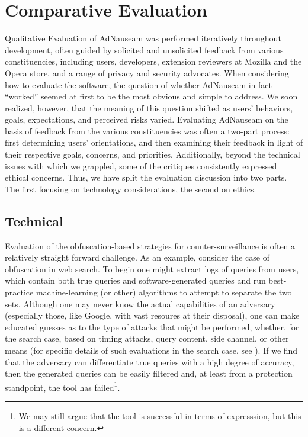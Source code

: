 \documentclass[conference]{IEEEtran}
\begin{document}
\section{Comparative Evaluation}

Qualitative Evaluation of AdNauseam was performed iteratively throughout development, often guided by solicited and unsolicited feedback from various constituencies, including users, developers, extension reviewers at Mozilla and the Opera store, and a range of privacy and security advocates. When considering how to evaluate the software, the question of whether AdNauseam in fact “worked” seemed at first to be the most obvious and simple to address. We soon realized, however, that the meaning of this question shifted as users' behaviors, goals, expectations, and perceived risks varied. Evaluating AdNauseam on the basis of feedback from the various constituencies was often a two-part process: first determining users' orientations, and then examining their feedback in light of their respective goals, concerns, and priorities. Additionally, beyond the technical issues with which we grappled, some of the critiques consistently expressed ethical concerns. Thus, we have split the evaluation discussion into two parts. The first focusing on technology considerations, the second on ethics.

\subsection{Technical}

Evaluation of the obfuscation-based strategies for counter-surveillance is often a relatively straight forward challenge. As an example, consider the case of obfuscation in web search. To begin one might extract logs of queries from users, which contain both true queries and software-generated queries and run best-practice machine-learning (or other) algorithms to attempt to separate the two sets. Although one may never know the actual capabilities of an adversary (especially those, like Google, with vast resoures at their disposal), one can make educated guesses as to the type of attacks that might be performed, whether, for the search case, based on timing attacks, query content, side channel, or other means (for specific details of such evaluations in the search case, see \cite{Gervais,Balsa,Peddinti}).  If we find that the adversary can differentiate true queries with a high degree of accuracy, then the generated queries can be easily filtered  and, at least from a protection standpoint, the tool has failed\footnote{We may still argue that the tool is successful in terms of expresssion, but this is a different concern.}.
\end{document}
